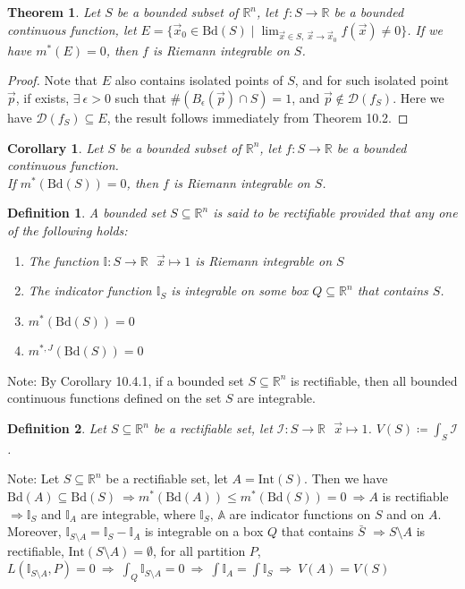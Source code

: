 \documentclass[11pt,oneside]{book}
\theoremstyle{break}
\theoremstyle{break}
\newtheorem{thm}{Theorem}[section]
\newtheorem{corT}[lem]{Corollary}
\newtheorem{defn}{Definition}[corL]
\newcommand{\R}{\mathbb{R}}
\newcommand{\D}{\mathcal{D}}
\newcommand{\Int}{\text{Int}}
\newcommand{\Bd}{\text{Bd}}
\newcommand{\note}{\color{red}Note: \color{black}}
\begin{document}
\begin{thm}
Let $S$ be a bounded subset of $\R^n$, let $f:S \to \R$ be a bounded continuous function, let $E = \{ \vec{x}_0 \in \Bd(S) \mid\lim_{\vec{x}\in S,\ \vec{x}\to \vec{x}_0} f(\vec{x}) \neq 0 \}$. If we have $m^*(E) = 0$, then $f$ is Riemann integrable on $S$. 
\end{thm}
\begin{proof}
Note that $E$ also contains isolated points of $S$, and for such isolated point $\vec{p}$, if exists, $\exists\ \epsilon >0$ such that $\#(B_\epsilon(\vec{p}) \cap S) = 1$, and $\vec{p}\notin \D(f_S)$. Here we have $\D(f_S) \subseteq E$, the result follows immediately from Theorem 10.2. 
\end{proof}

\begin{corT}
Let $S$ be a bounded subset of $\R^n$, let $f:S \to \R$ be a bounded continuous function.\\ 
If $m^*(\Bd(S)) = 0$, then $f$ is Riemann integrable on $S$. 
\end{corT}

\begin{defn}
A bounded set $S \subseteq \R^n$ is said to be rectifiable provided that any one of the following holds:
\begin{enumerate}[topsep=3pt,itemsep=-1ex,partopsep=1ex,parsep=1ex]
\item The function $\mathbb{I}:S \to \R \ \ \ \vec{x}\mapsto 1$ is Riemann integrable on $S$
\item The indicator function $\mathbb{I}_S$ is integrable on some box $Q\subseteq \R^n$ that contains $S$.
\item $m^*(\Bd(S)) = 0$
\item $m^{*,J}(\Bd(S)) = 0$
\end{enumerate} 
\end{defn}
\note By Corollary 10.4.1, if a bounded set $S\subseteq \R^n$ is rectifiable, then all bounded continuous functions defined on the set $S$ are integrable.

\begin{defn}
Let $S\subseteq \R^n$ be a rectifiable set, let $\mathcal{I}:S \to \R \ \ \ \vec{x}\mapsto 1$. $V(S) \coloneqq \int_{S} \mathcal{I}$.
\end{defn}


\note Let $S\subseteq \R^n$ be a rectifiable set, let $A = \Int(S)$. Then we have $\Bd(A) \subseteq \Bd(S) \ \Rightarrow  m^*(\Bd(A)) \leq m^*(\Bd(S)) = 0\ \Rightarrow A$ is rectifiable $\Rightarrow \mathbb{I}_S$ and $\mathbb{I}_A$ are integrable, where $\mathbb{I}_S,\,\mathbb{A}$ are indicator functions on $S$ and on $A$. Moreover, $\mathbb{I}_{S\setminus A}= \mathbb{I}_S - \mathbb{I}_A$ is integrable on a box $Q$ that contains $\bar{S}$ $\Rightarrow S\setminus A$ is rectifiable, $\Int(S\setminus A) = \emptyset$, for all partition $P$, $L(\mathbb{I}_{S\setminus A}, P) = 0 \ \Rightarrow\ \int_Q \mathbb{I}_{S\setminus A} = 0\ \Rightarrow \ \int \mathbb{I}_A = \int \mathbb{I}_S\  \Rightarrow \ V(A) = V(S)$ \\
\end{document}
